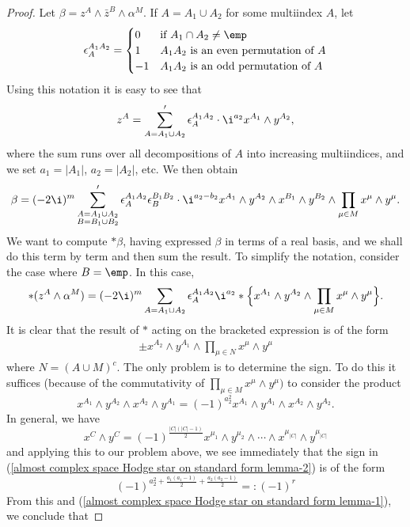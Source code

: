 \begin{proof}
Let $\beta=z^A\wedge\bar{z}^B\wedge\alpha^M$. If $A=A_1\cup A_2$ for some multiindex $A$, let
\[\epsilon_A^{A_1A_2}=\begin{cases}
0&\text{if $A_1\cap A_2\neq\emp$}\\
1&\text{$A_1A_2$ is an even permutation of $A$}\\
-1&\text{$A_1A_2$ is an odd permutation of $A$}
\end{cases}\]
Using this notation it is easy to see that
\[z^A=\sum_{A=A_1\cup A_2}'\epsilon_A^{A_1A_2}\cdot\i^{a_2}x^{A_1}\wedge y^{A_2},\]
where the sum runs over all decompositions of $A$ into increasing multiindices, and we set $a_1=|A_1|$, $a_2=|A_2|$, etc. We then obtain 
\[\beta=(-2\i)^m\sum'_{\substack{A=A_1\cup A_2\\B=B_1\cup B_2}}\epsilon_A^{A_1A_2}\epsilon_B^{B_1B_2}\cdot\i^{a_2-b_2}x^{A_1}\wedge y^{A_2}\wedge x^{B_1}\wedge y^{B_2}\wedge\prod_{\mu\in M}x^\mu\wedge y^\mu.\]
We want to compute $\ast\beta$, having expressed $\beta$ in terms of a real basis, and we shall do this term by term and then sum the result. To simplify the notation, consider the case where $B=\emp$. In this case,
\begin{align}\label{almost complex space Hodge star on standard form lemma-1}
\ast(z^A\wedge\alpha^M)=(-2\i)^m\sum_{A=A_1\cup A_2}\epsilon_A^{A_1A_2}\i^{a_2}\ast\Big\{x^{A_1}\wedge y^{A_2}\wedge\prod_{\mu\in M}x^\mu\wedge y^\mu\Big\}.
\end{align}
It is clear that the result of $\ast$ acting on the bracketed expression is of the form
\begin{align}\label{almost complex space Hodge star on standard form lemma-2}
\pm x^{A_2}\wedge y^{A_1}\wedge\prod_{\mu\in N}x^\mu\wedge y^\mu
\end{align}
where $N=(A\cup M)^c$. The only problem is to determine the sign. To do this it suffices (because of the commutativity of $\prod_{\mu\in M}x^\mu\wedge y^\mu)$ to consider the product
\[x^{A_1}\wedge y^{A_2}\wedge x^{A_2}\wedge y^{A_1}=(-1)^{a_2^2}x^{A_1}\wedge y^{A_1}\wedge x^{A_2}\wedge y^{A_2}.\]
In general, we have
\[x^C\wedge y^C=(-1)^{\frac{|C|(|C|-1)}{2}}x^{\mu_1}\wedge y^{\mu_2}\wedge\cdots\wedge x^{\mu_{|C|}}\wedge y^{\mu_{|C|}}\]
and applying this to our problem above, we see immediately that the sign in (\ref{almost complex space Hodge star on standard form lemma-2}) is of the form
\[(-1)^{a_2^2+\frac{a_1(a_1-1)}{2}+\frac{a_2(a_2-1)}{2}}=:(-1)^r\]
From this and (\ref{almost complex space Hodge star on standard form lemma-1}), we conclude that

\end{proof}
